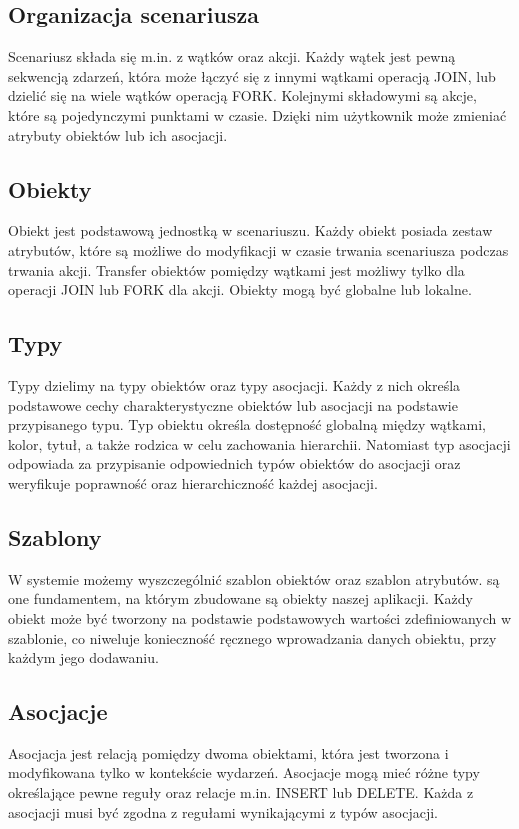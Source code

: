 \subsection{Organizacja scenariusza}
Scenariusz składa się m.in. z wątków oraz akcji. Każdy wątek jest pewną sekwencją zdarzeń, która może łączyć się z innymi wątkami operacją JOIN, lub dzielić się na wiele wątków operacją FORK.
Kolejnymi składowymi są akcje, które są pojedynczymi punktami w czasie. Dzięki nim użytkownik może zmieniać atrybuty obiektów lub ich asocjacji.

\subsection{Obiekty}
Obiekt jest podstawową jednostką w scenariuszu. Każdy obiekt posiada zestaw atrybutów, które są możliwe do modyfikacji w czasie trwania scenariusza podczas trwania akcji.
Transfer obiektów pomiędzy wątkami jest możliwy tylko dla operacji JOIN lub FORK dla akcji. Obiekty mogą być globalne lub lokalne.

\subsection{Typy}
Typy dzielimy na typy obiektów oraz typy asocjacji. Każdy z nich określa podstawowe cechy charakterystyczne obiektów lub asocjacji na podstawie przypisanego typu.
Typ obiektu określa dostępność globalną między wątkami, kolor, tytuł, a także rodzica w celu zachowania hierarchii. Natomiast typ asocjacji odpowiada za przypisanie odpowiednich typów obiektów do asocjacji oraz weryfikuje poprawność oraz hierarchiczność każdej asocjacji.

\subsection{Szablony}
W systemie możemy wyszczególnić szablon obiektów oraz szablon atrybutów. są one fundamentem, na którym zbudowane są obiekty naszej aplikacji.
Każdy obiekt może być tworzony na podstawie podstawowych wartości zdefiniowanych w szablonie, co niweluje konieczność ręcznego wprowadzania danych obiektu, przy każdym jego dodawaniu.

\subsection{Asocjacje}
Asocjacja jest relacją pomiędzy dwoma obiektami, która jest tworzona i modyfikowana tylko w kontekście wydarzeń. Asocjacje mogą mieć różne typy określające pewne reguły oraz relacje m.in. INSERT lub DELETE.
Każda z asocjacji musi być zgodna z regułami wynikającymi z typów asocjacji.

